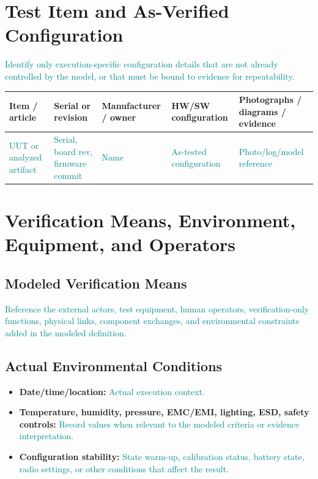 \documentclass{../common/latex/delta_base_styles/delta_base_styles}
\newcommand{\placeholder}[1]{\textcolor{DarkCyan}{#1}}
\begin{document}
\section{Test Item and As-Verified Configuration}
\placeholder{Identify only execution-specific configuration details that are not already controlled by the model, or that must be bound to evidence for repeatability.}

\begin{tabular}{|>{\centering\arraybackslash}m{2.7cm}
                |>{\centering\arraybackslash}m{2.7cm}
                |>{\centering\arraybackslash}m{2.7cm}
                |>{\centering\arraybackslash}m{3.1cm}
                |>{\centering\arraybackslash}m{3.4cm}|}
\hline
\textbf{Item / article} & \textbf{Serial or revision} & \textbf{Manufacturer / owner} & \textbf{HW/SW configuration} & \textbf{Photographs / diagrams / evidence} \\
\hline
\placeholder{UUT or analyzed artifact} & \placeholder{Serial, board rev, firmware commit} & \placeholder{Name} & \placeholder{As-tested configuration} & \placeholder{Photo/log/model reference} \\
\hline
\end{tabular}

\section{Verification Means, Environment, Equipment, and Operators}
\subsection{Modeled Verification Means}
\placeholder{Reference the external actors, test equipment, human operators, verification-only functions, physical links, component exchanges, and environmental constraints added in the modeled definition.}

\subsection{Actual Environmental Conditions}
\begin{itemize}
  \item \textbf{Date/time/location:} \placeholder{Actual execution context.}
  \item \textbf{Temperature, humidity, pressure, EMC/EMI, lighting, ESD, safety controls:} \placeholder{Record values when relevant to the modeled criteria or evidence interpretation.}
  \item \textbf{Configuration stability:} \placeholder{State warm-up, calibration status, battery state, radio settings, or other conditions that affect the result.}
\end{itemize}
\end{document}
